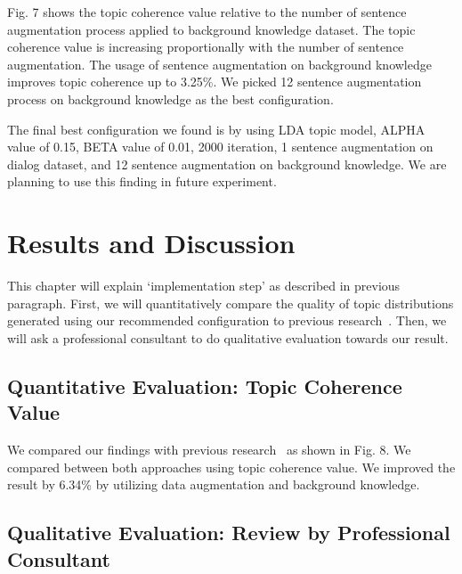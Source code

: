 \documentclass[senior]{IPSstyle}
\begin{document}
Fig. 7 shows the topic coherence value relative to the number of sentence augmentation process applied to background knowledge dataset. The topic coherence value is increasing proportionally with the number of sentence augmentation. The usage of sentence augmentation on background knowledge improves topic coherence up to 3.25\%. We picked 12 sentence augmentation process on background knowledge as the best configuration.

The final best configuration we found is by using LDA topic model, ALPHA value of 0.15, BETA value of 0.01, 2000 iteration, 1 sentence augmentation on dialog dataset, and 12 sentence augmentation on background knowledge. We are planning to use this finding in future experiment.

\chapter{Results and Discussion} 

This chapter will explain ‘implementation step’ as described in previous paragraph. First, we will quantitatively compare the quality of topic distributions generated using our recommended configuration to previous research~\cite{goto2}. Then, we will ask a professional consultant to do qualitative evaluation towards our result.

\section{Quantitative Evaluation: Topic Coherence Value}

We compared our findings with previous research~\cite{goto2} as shown in Fig. 8. We compared between both approaches using topic coherence value. We improved the result by 6.34\% by utilizing data augmentation and background knowledge.

\section{Qualitative Evaluation: Review by Professional Consultant}
\end{document}
